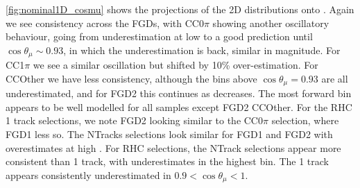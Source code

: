 \autoref{fig:nominal1D_cosmu} shows the projections of the 2D distributions onto \cosmu. Again we see consistency across the FGDs, with CC0$\pi$ showing another oscillatory behaviour, going from underestimation at low \cosmu to a good prediction until $\cos \theta_\mu \sim 0.93$, in which the underestimation is back, similar in magnitude. For CC1$\pi$ we see a similar oscillation but shifted by 10\% over-estimation. For \numu CCOther we have less consistency, although the bins above $\cos \theta_\mu = 0.93$ are all underestimated, and for FGD2 this continues as \cosmu decreases. The most forward bin appears to be well modelled for all \numu samples except FGD2 CCOther. For the RHC 1 track selections, we note FGD2 looking similar to the CC0$\pi$ selection, where FGD1 less so. The NTracks selections look similar for FGD1 and FGD2 with overestimates at high \cosmu. For RHC \numu selections, the NTrack selections appear more consistent than 1 track, with underestimates in the highest \cosmu bin. The 1 track appears consistently underestimated in $0.9 < \cos\theta_\mu < 1$.
